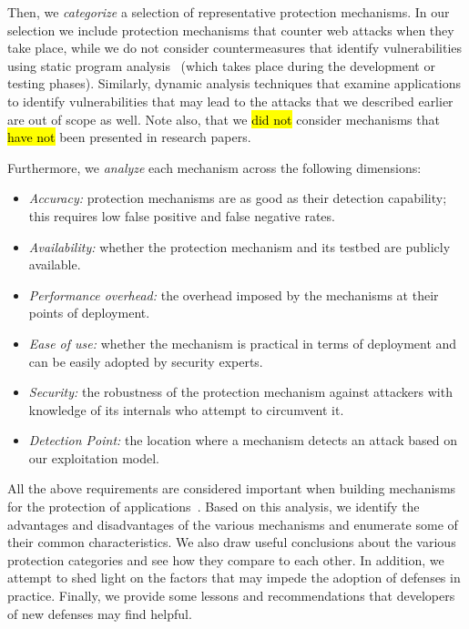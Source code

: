 \documentclass[10pt,journal,compsoc]{IEEEtran}
\newcommand{\hlc}[2][yellow]{ {\sethlcolor{#1} \hl{#2}} }
\begin{document}
Then, we {\it categorize} a selection of representative
protection mechanisms. In our selection we include protection
mechanisms that counter web attacks when they take place,
while we do not consider countermeasures that identify
vulnerabilities using static program analysis~\cite{SZ12}
(which takes place during the development or testing
phases). Similarly, dynamic analysis techniques that examine
applications to identify vulnerabilities that may lead to the attacks
that we described earlier are out of scope as well. Note also, that we
\hlc[yellow]{did not} consider mechanisms that
\hlc[yellow]{have not} been presented in research papers.

Furthermore, we {\it analyze} each mechanism across the
following dimensions:
\vspace{-1.5mm}
\begin{itemize}
\item {\it Accuracy:} protection mechanisms are as good
  as their detection capability; this requires low false positive and
  false negative rates.
\item {\it Availability:} whether the protection mechanism and its
  testbed are publicly available.
\item {\it Performance overhead:} the 
  overhead imposed by the mechanisms at their points of deployment.
\item {\it Ease of use:} whether the
  mechanism is practical in terms of deployment
  and can be easily adopted by security experts.
\item {\it Security:} the robustness of the protection mechanism against
  attackers with knowledge of its internals who attempt to circumvent it.
\item {\it Detection Point:} the location where a mechanism detects an attack
  based on our exploitation model.
\end{itemize}
\vspace{-1.5mm} 
\noindent
All the above requirements are considered important
when building mechanisms for the protection of
applications~\cite{A00,SPWS13,nature2014}.
Based on this analysis, we identify the advantages
and disadvantages of the
various mechanisms and enumerate some of their common
characteristics. We also draw useful conclusions
about the various protection categories and see how they compare
to each other.
In addition, we attempt to shed light on the factors
that may impede the adoption of defenses in practice.
Finally,
we provide some lessons and recommendations that
developers of new defenses may find helpful.
\end{document}
